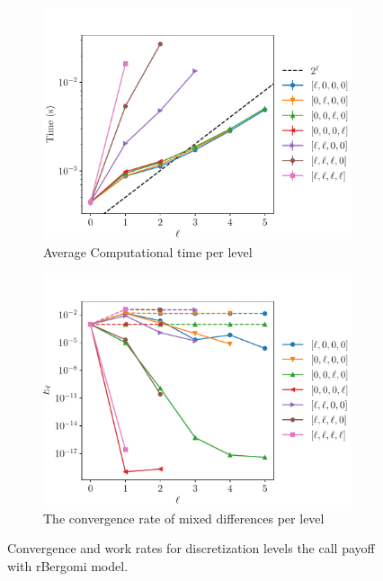 \documentclass[11pt]{article}
\begin{document}
\begin{figure}[!h]
	\centering
	\begin{subfigure}{.5\textwidth}
		\centering
		\includegraphics[width=0.95\linewidth]{./figures/rbergomi_2_steps_K_1_2/level_work.pdf}
		\caption{Average Computational time per level}
		\label{fig:misc_rbergomi_2_steps_K_1_2_sub3}
	\end{subfigure}%
	\begin{subfigure}{.5\textwidth}
		\centering
		\includegraphics[width=0.95\linewidth]{./figures/rbergomi_2_steps_K_1_2/levels_error_rate.pdf}
		\caption{  The convergence rate of mixed differences per level}
		\label{fig:misc_rbergomi_2_steps_K_1_2_sub4}
	\end{subfigure}%
	\caption{Convergence and work rates for discretization levels  the call payoff with rBergomi model.}
	\label{fig:misc_rbergomi_2_steps_K_1_2_2}
\end{figure}
\end{document}
